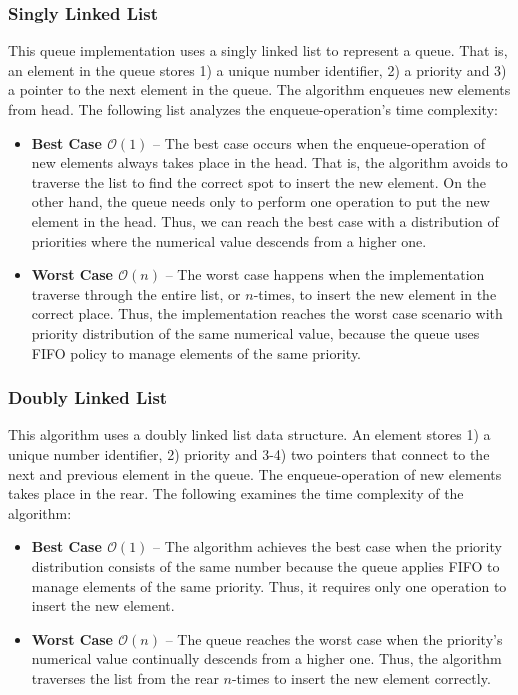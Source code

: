 \documentclass[a4paper,11pt]{kth-mag}
\begin{document}
\subsubsection{Singly Linked List}\label{sec:singly}
This queue implementation uses a singly linked list to represent a queue.
That is, an element in the queue stores 1) a unique number identifier, 2) a priority and 3) a pointer to the next element in the queue.
The algorithm enqueues new elements from head.
The following list analyzes the enqueue-operation's time complexity:
\begin{itemize}
    \item \textbf{Best Case $\mathcal{O}(1)$} --
        The best case occurs when the enqueue-operation of new elements always takes place in the head.
        That is, the algorithm avoids to traverse the list to find the correct spot to insert the new element.
        On the other hand, the queue needs only to perform one operation to put the new element in the head.
        Thus, we can reach the best case with a distribution of priorities where the numerical value descends from a higher one.
    \item \textbf{Worst Case $\mathcal{O}(n)$} --
        The worst case happens when the implementation traverse through the entire list, or $n$-times, to insert the new element in the correct place.
        Thus, the implementation reaches the worst case scenario with priority distribution of the same numerical value, because the queue uses FIFO policy to manage elements of the same priority.
\end{itemize}

\subsubsection{Doubly Linked List}
This algorithm uses a doubly linked list data structure.
An element stores 1) a unique number identifier, 2) priority and 3-4) two pointers that connect to the next and previous element in the queue.
The enqueue-operation of new elements takes place in the rear.
The following examines the time complexity of the algorithm:
\begin{itemize}
    \item \textbf{Best Case $\mathcal{O}(1)$} --
        The algorithm achieves the best case when the priority distribution consists of the same number because the queue applies FIFO to manage elements of the same priority.
        Thus, it requires only one operation to insert the new element.
    \item \textbf{Worst Case $\mathcal{O}(n)$} --
        The queue reaches the worst case when the priority's numerical value continually descends from a higher one.
        Thus, the algorithm traverses the list from the rear $n$-times to insert the new element correctly.
\end{itemize}
\end{document}
